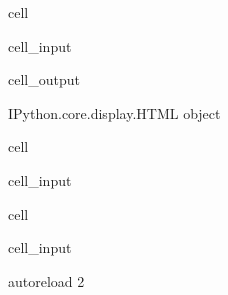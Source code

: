 \documentclass[letterpaper,10pt,english]{jupyterBook}
\begin{document}
\begin{sphinxuseclass}{cell}\begin{sphinxVerbatimInput}

\begin{sphinxuseclass}{cell_input}
\begin{sphinxVerbatim}[commandchars=\\\{\}]
    
\end{sphinxVerbatim}

\end{sphinxuseclass}\end{sphinxVerbatimInput}
\begin{sphinxVerbatimOutput}

\begin{sphinxuseclass}{cell_output}
\begin{sphinxVerbatim}[commandchars=\\\{\}]
\PYGZlt{}IPython.core.display.HTML object\PYGZgt{}
\end{sphinxVerbatim}

\end{sphinxuseclass}\end{sphinxVerbatimOutput}

\end{sphinxuseclass}
\begin{sphinxuseclass}{cell}\begin{sphinxVerbatimInput}

\begin{sphinxuseclass}{cell_input}
\begin{sphinxVerbatim}[commandchars=\\\{\}]
     
    
 
\end{sphinxVerbatim}

\end{sphinxuseclass}\end{sphinxVerbatimInput}

\end{sphinxuseclass}
\begin{sphinxuseclass}{cell}\begin{sphinxVerbatimInput}

\begin{sphinxuseclass}{cell_input}
\begin{sphinxVerbatim}[commandchars=\\\{\}]
 autoreload
 2
\end{sphinxVerbatim}

\end{sphinxuseclass}\end{sphinxVerbatimInput}

\end{sphinxuseclass}
\end{document}

